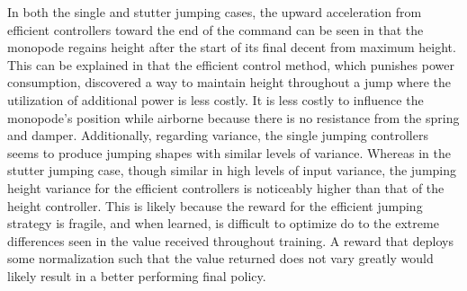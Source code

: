 In both the single and stutter jumping cases, the upward acceleration from efficient controllers toward the end of the command can be seen in that the monopode regains height after the start of its final decent from maximum height. This can be explained in that the efficient control method, which punishes power consumption, discovered a way to maintain height throughout a jump where the utilization of additional power is less costly. It is less costly to influence the monopode's position while airborne because there is no resistance from the spring and damper. Additionally, regarding variance, the single jumping controllers seems to produce jumping shapes with similar levels of variance. Whereas in the stutter jumping case, though similar in high levels of input variance, the jumping height variance for the efficient controllers is noticeably higher than that of the height controller. This is likely because the reward for the efficient jumping strategy is fragile, and when learned, is difficult to optimize do to the extreme differences seen in the value received throughout training. A reward that deploys some normalization such that the value returned does not vary greatly would likely result in a better performing final policy.
% 
